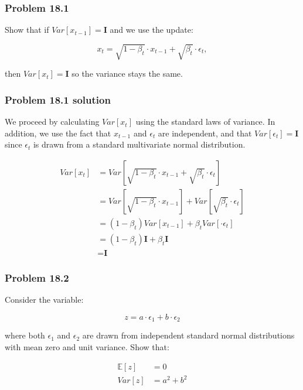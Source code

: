 \documentclass[
10pt, %
a4paper, %
oneside, %
headinclude,footinclude, %
BCOR5mm, %
]{scrartcl}
\begin{document}
\subsubsection*{Problem 18.1}

Show that if $Var[x_{t-1}] = \textbf{I}$ and we use the update:

\begin{equation*}
  x_t = \sqrt{1-\beta_t}\cdot x_{t-1} + \sqrt{\beta_t} \cdot \epsilon_t,
\end{equation*}

then $Var[x_t] = \textbf{I}$ so the variance stays the same.

\subsubsection*{Problem 18.1 solution}

We proceed by calculating $Var[x_t]$ using the standard laws of variance. In addition, we use the fact that $x_{t-1}$ and $\epsilon_t$ are independent, and that $Var[\epsilon_t] = \textbf{I}$ since $\epsilon_t$ is drawn from a standard multivariate normal distribution.

\begin{align*}
  Var[x_t] &= Var[\sqrt{1-\beta_t}\cdot x_{t-1} + \sqrt{\beta_t} \cdot \epsilon_t] \\
  &= Var[\sqrt{1-\beta_t}\cdot x_{t-1}] + Var[\sqrt{\beta_t} \cdot \epsilon_t] \\
  &= (1-\beta_t) Var[x_{t-1}] + \beta_t Var[ \cdot \epsilon_t] \\
  &= (1-\beta_t) \textbf{I} + \beta_t \textbf{I} \\
  &= \textbf{I}
\end{align*}

\subsubsection*{Problem 18.2}

Consider the variable:

$$z = a \cdot \epsilon_1 + b \cdot \epsilon_2$$

where both $\epsilon_1$ and $\epsilon_2$ are drawn from independent standard normal distributions with mean zero and unit variance. Show that:

\begin{align*}
  \mathbb{E}[z] &= 0 \\
  Var[z] &= a^2 + b^2
\end{align*}
\end{document}
